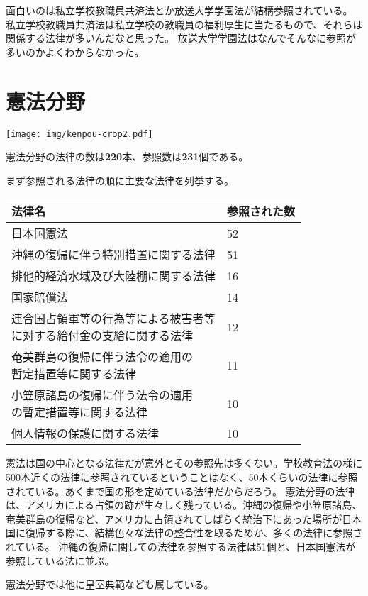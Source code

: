 \documentclass[a5j,openany,twoside]{jsbook}
\begin{document}
面白いのは私立学校教職員共済法とか放送大学学園法が結構参照されている。
私立学校教職員共済法は私立学校の教職員の福利厚生に当たるもので、それらは関係する法律が多いんだなと思った。
放送大学学園法はなんでそんなに参照が多いのかよくわからなかった。

\section{憲法分野}

\texttt{[image: img/kenpou-crop2.pdf]}

憲法分野の法律の数は\textbf{220}本、参照数は\textbf{231}個である。

まず参照される法律の順に主要な法律を列挙する。

\begin{table}[htb]
  \begin{tabular}{|l|l|}  \hline
法律名 & 参照された数 \\ \hline \hline
日本国憲法 & 52 \\
沖縄の復帰に伴う特別措置に関する法律 & 51 \\
排他的経済水域及び大陸棚に関する法律 & 16 \\
国家賠償法 & 14 \\
\shortstack{連合国占領軍等の行為等による被害者等 \\ に対する給付金の支給に関する法律} & 12 \\
\shortstack{奄美群島の復帰に伴う法令の適用の \\ 暫定措置等に関する法律} & 11 \\
\shortstack{小笠原諸島の復帰に伴う法令の適用 \\  の暫定措置等に関する法律} & 10 \\
個人情報の保護に関する法律 & 10 \\ \hline
  \end{tabular}
\end{table}

憲法は国の中心となる法律だが意外とその参照先は多くない。学校教育法の様に500本近くの法律に参照されているということはなく、50本くらいの法律に参照されている。あくまで国の形を定めている法律だからだろう。
憲法分野の法律は、アメリカによる占領の跡が生々しく残っている。沖縄の復帰や小笠原諸島、奄美群島の復帰など、アメリカに占領されてしばらく統治下にあった場所が日本国に復帰する際に、結構色々な法律の整合性を取るためか、多くの法律に参照されている。
沖縄の復帰に関しての法律を参照する法律は51個と、日本国憲法が参照している法に並ぶ。

憲法分野では他に皇室典範なども属している。
\end{document}
